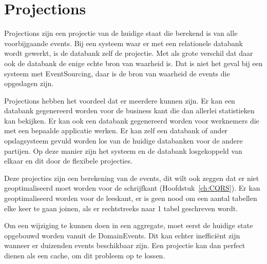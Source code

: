 
\section{Projections}
\label{sec:projections}

Projections zijn een projectie van de huidige staat die berekend is van alle voorbijgaande events. Bij een systeem waar er met een relationele databank wordt gewerkt, is de databank zelf de projectie. Met als grote verschil dat daar ook de databank de enige echte bron van waarheid is. Dat is niet het geval bij een systeem met EventSourcing, daar is de bron van waarheid de events die opgeslagen zijn.

Projections hebben het voordeel dat er meerdere kunnen zijn. Er kan een databank gegenereerd worden voor de business kant die dan allerlei statistieken kan bekijken. Er kan ook een databank gegenereerd worden voor werknemers die met een bepaalde applicatie werken. Er kan zelf een databank of ander opslagsysteem gevuld worden los van de huidige databanken voor de andere partijen. Op deze manier zijn het systeem en de databank losgekoppeld van elkaar en dit door de flexibele projecties. 

Deze projecties zijn een berekening van de events, dit wilt ook zeggen dat er niet geoptimaliseerd moet worden voor de schrijfkant (Hoofdstuk~\ref{ch:CQRS}). Er kan geoptimaliseerd worden voor de leeskant, er is geen nood om een aantal tabellen elke keer te gaan joinen, als er rechtstreeks naar 1 tabel geschreven wordt.

Om een wijziging te kunnen doen in een aggregate, moet eerst de huidige state opgebouwd worden vanuit de DomainEvents. Dit kan echter inefficiënt zijn wanneer er duizenden events beschikbaar zijn. Een projectie kan dan perfect dienen als een cache, om dit probleem op te lossen.
